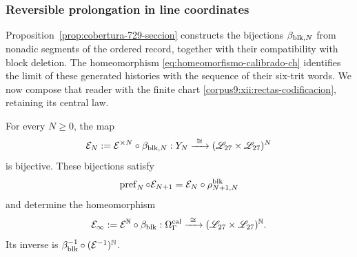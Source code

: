 \subsubsection{Reversible prolongation in line coordinates}
\label{corpus9:xii:rectas-prolongacion}

Proposition~\ref{prop:cobertura-729-seccion} constructs the bijections
\(\beta_{{\rm blk},N}\) from nonadic segments of the ordered record,
together with their compatibility with block deletion. The homeomorphism
\eqref{eq:homeomorfismo-calibrado-ch} identifies the limit of these
generated histories with the sequence of their six-trit words.
We now compose that reader with the finite chart
\eqref{corpus9:xii:rectas-codificacion}, retaining its central law.

\begin{theorem}
\label{corpus9:xii:rectas-homeomorfismo}
For every \(N\geq0\), the map
\begin{equation}
 \mathcal E_N:=\mathcal E^{\times N}\circ\beta_{{\rm blk},N}:
 Y_N\xrightarrow{\ \cong\ }
 (\mathscr L_{27}\times\mathscr L_{27})^N
 \label{corpus9:xii:rectas-nivel}
\end{equation}
is bijective. These bijections satisfy
\begin{equation}
 \operatorname{pref}_N\circ\mathcal E_{N+1}
 =\mathcal E_N\circ\rho^{\rm blk}_{N+1,N}
 \label{corpus9:xii:rectas-truncamiento}
\end{equation}
and determine the homeomorphism
\begin{equation}
 \mathcal E_\infty:=\mathcal E^{\mathbb N}\circ\beta_{\rm blk}:
 \Omega_\Gamma^{\rm cal}\xrightarrow{\ \cong\ }
 (\mathscr L_{27}\times\mathscr L_{27})^{\mathbb N}.
 \label{corpus9:xii:rectas-limite}
\end{equation}
Its inverse is
\(\beta_{\rm blk}^{-1}\circ(\mathcal E^{-1})^{\mathbb N}\).
\end{theorem}
